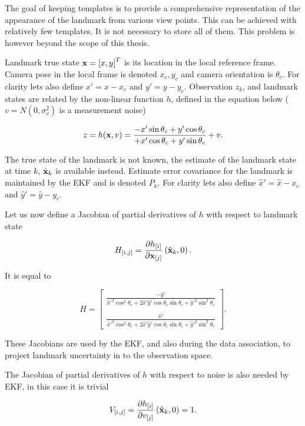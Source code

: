 The goal of keeping templates is to provide a comprehensive
representation of the appearance of the landmark from various view
points. This can be achieved with relatively few templates. It is not
necessary to store all of them. This problem is however beyond the
scope of this thesis.

Landmark true state ${\bf x} = \left[x,y \right]^T$ is its location
 in the local reference frame. Camera pose in the local frame is
 denoted $x_c,y_c$ and camera orientation is $\theta_c$. For clarity
 lets also define $x'=x-x_c$ and $y'=y-y_c$.  Observation $z_k$, and
 landmark states are related by the non-linear function $h$, defined
 in the equation below ($v = N(0,\sigma_{v}^2)$ is a measurement
 noise)

$$
z = h({\bf x},v) =
\frac{-x'\sin \theta_c + y' \cos \theta_c }
     {+x'\cos \theta_c + y' \sin \theta_c } + v.
$$

The true state of the landmark is not known, the estimate of the
landmark state at time $k$, $\hat{\bf x}_k$ is available
instead. Estimate error covariance for the landmark is maintained by
the EKF and is denoted $P_k$. For clarity lets also define
$\hat{x}'=\hat{x}-x_c$ and $\hat{y}'=\hat{y}-y_c$.

Let us now define a Jacobian of partial derivatives of $h$ with
respect to landmark state

$$
H_{[i,j]} = \frac{\partial h_{[i]}}{\partial {\bf x}_{[j]}}
             \left(\hat{\bf x}_k , 0 \right).
$$

It is equal to

$$
  H = \left[ 
\begin{array}{c}
\frac{-\hat{y}'}
{\hat{x}'^2 \cos^2 \theta_c + 2\hat{x}'\hat{y}'\cos\theta_c\sin\theta_c + \hat{y}'^2\sin^2  \theta_c }\\
{}\\
\frac{\hat{x}'}
{\hat{x}'^2 \cos^2 \theta_c + 2\hat{x}'\hat{y}'\cos\theta_c\sin\theta_c + \hat{y}'^2\sin^2 \theta_c }
\end{array}
      \right].
$$

These Jacobians are used by the EKF, and also during the data association,
to project landmark uncertainty in to the observation space.

The Jacobian of partial derivatives of $h$ with respect
to noise is also needed by EKF, in this case it is trivial

$$
V_{[i,j]} = \frac{\partial h_{[i]}}{\partial v_{[j]}}
             \left(\hat{\bf x}_k , 0 \right) = 1.
$$


